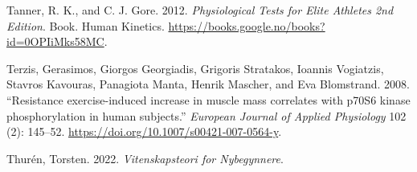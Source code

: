 \documentclass[
  letterpaper,
  DIV=11,
  numbers=noendperiod]{scrreprt}
\newlength{\cslhangindent}
\newenvironment{CSLReferences}[2] %
 {\begin{list}{}{%
  \setlength{\itemindent}{0pt}
  \setlength{\leftmargin}{0pt}
  \setlength{\parsep}{0pt}
  \ifodd #1
   \setlength{\leftmargin}{\cslhangindent}
   \setlength{\itemindent}{-1\cslhangindent}
  \fi
  \setlength{\itemsep}{#2\baselineskip}}}
 {\end{list}}
\begin{document}
\begin{CSLReferences}{1}{0}
Tanner, R. K., and C. J. Gore. 2012. \emph{Physiological Tests for Elite
Athletes 2nd Edition}. Book. Human Kinetics.
\url{https://books.google.no/books?id=0OPIiMks58MC}.

Terzis, Gerasimos, Giorgos Georgiadis, Grigoris Stratakos, Ioannis
Vogiatzis, Stavros Kavouras, Panagiota Manta, Henrik Mascher, and Eva
Blomstrand. 2008. {``Resistance exercise-induced increase in muscle mass
correlates with p70S6 kinase phosphorylation in human subjects.''}
\emph{European Journal of Applied Physiology} 102 (2): 145--52.
\url{https://doi.org/10.1007/s00421-007-0564-y}.

Thurén, Torsten. 2022. \emph{Vitenskapsteori for Nybegynnere}.

\end{CSLReferences}
\end{document}
